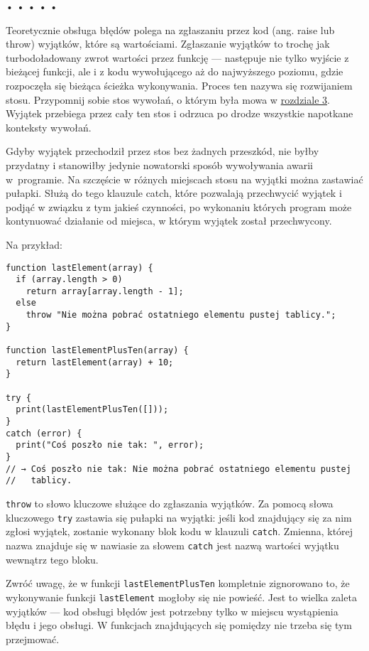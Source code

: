 \begin{center}
• • • • •
\end{center}

  
Teoretycznie obsługa błędów polega na zgłaszaniu przez kod (ang. raise lub throw) wyjątków, które są wartościami. Zgłaszanie wyjątków to trochę jak turbodoładowany zwrot wartości przez funkcję — następuje nie tylko wyjście z bieżącej funkcji, ale i z kodu wywołującego aż do najwyższego poziomu, gdzie rozpoczęła się bieżąca ścieżka wykonywania. Proces ten nazywa się rozwijaniem stosu. Przypomnij sobie stos wywołań, o którym była mowa w \hyperref[chap:3]{rozdziale 3}. Wyjątek przebiega przez cały ten stos i odrzuca po drodze wszystkie napotkane konteksty wywołań.

  
Gdyby wyjątek przechodził przez stos bez żadnych przeszkód, nie byłby przydatny i stanowiłby jedynie nowatorski sposób wywoływania awarii w~programie. Na szczęście w różnych miejscach stosu na wyjątki można zastawiać pułapki. Służą do tego klauzule catch, które pozwalają przechwycić wyjątek i podjąć w związku z tym jakieś czynności, po wykonaniu których program może kontynuować działanie od miejsca, w którym wyjątek został przechwycony.

  
Na przykład:

  
\begin{verbatim} 
function lastElement(array) {
  if (array.length > 0)
    return array[array.length - 1];
  else
    throw "Nie można pobrać ostatniego elementu pustej tablicy.";
}

function lastElementPlusTen(array) {
  return lastElement(array) + 10;
}

try {
  print(lastElementPlusTen([]));
}
catch (error) {
  print("Coś poszło nie tak: ", error);
}
// → Coś poszło nie tak: Nie można pobrać ostatniego elementu pustej 
//   tablicy.
\end{verbatim}
  
\texttt{throw} to słowo kluczowe służące do zgłaszania wyjątków. Za pomocą słowa kluczowego \texttt{try} zastawia się pułapki na wyjątki: jeśli kod znajdujący się za nim zgłosi wyjątek, zostanie wykonany blok kodu w klauzuli \texttt{catch}. Zmienna, której nazwa znajduje się w nawiasie za słowem \texttt{catch} jest nazwą wartości wyjątku wewnątrz tego bloku.

  
Zwróć uwagę, że w funkcji \texttt{lastElementPlusTen} kompletnie zignorowano to, że wykonywanie funkcji \texttt{lastElement} mogłoby się nie powieść. Jest to wielka zaleta wyjątków — kod obsługi błędów jest potrzebny tylko w miejscu wystąpienia błędu i jego obsługi. W funkcjach znajdujących się pomiędzy nie trzeba się tym przejmować.

